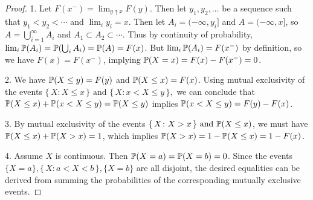 \documentclass[a4paper]{article}
\begin{document}
\begin{proof}[Proof]
	1. Let \(F(x^{-}) = \lim_{y \uparrow x } F(y) \). Then let \(y_{1}, y_{2}, \dots\) be a sequence such that \(y_{1} < y_{2} < \cdots\) and \(\lim_{i} y_{i} = x \). Then let \(A_{i} = (-\infty, y_{i}]\) and \(A = (-\infty, x]\), so \(A = \bigcup_{i=1}^{\infty} A_{i}\) and \(A_{1} \subset A_{2} \subset \cdots \). Thus by continuity of probability, \(\lim_{i} \mathbb{P}(A_{i}) = \mathbb{P}(\bigcup_{i} A_{i}) = \mathbb{P}(A) = F(x) \). But \(\lim_{i} \mathbb{P}(A_{i}) = F(x^{-})\) by definition, so we have \(F(x) = F(x^{-})\), implying \(\mathbb{P}(X = x) = F(x) - F(x^{-}) = 0\).
	\vspace{12pt}
	\par 2. We have \(\mathbb{P}(X \le y) = F(y)\) and \(\mathbb{P}(X \le x) = F(x)\). Using mutual exclusivity of the events \(\{\, X \colon X \le x\,\} \text{ and } \{\, X \colon x < X \le y \,\}, \) we can conclude that \(\mathbb{P}(X \le x) + \mathbb{P}(x < X \le y) = \mathbb{P}(X \le y)\) implies \(\mathbb{P}(x < X \le y) = F(y) - F(x)\).
\vspace{12pt}
	\par 3. By mutual exclusivity of the events \(\{\,X \colon X > x \,\} \text{ and } \mathbb{P}(X \le x)\), we must have \(\mathbb{P}(X \le x) + \mathbb{P}(X > x) = 1 \), which implies \(\mathbb{P}(X > x) = 1 - \mathbb{P}(X \le x) = 1 - F(x)\).
\vspace{12pt}
\par 4. Assume \(X\) is continuous. Then \(\mathbb{P}(X = a) = \mathbb{P}(X = b) = 0\). Since the events \(\{X = a\}, \{\, X \colon a < X < b \,\}, \{X = b \}\) are all disjoint, the desired equalities can be derived from summing the probabilities of the corresponding mutually exclusive events.
\end{proof}
\end{document}
